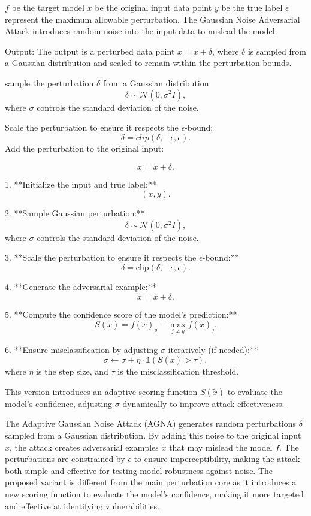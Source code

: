 \( f \) be the target model
\( x \) be the original input data point
\( y \) be the true label
\( \epsilon \) represent the maximum allowable perturbation. The Gaussian Noise Adversarial Attack introduces random noise into the input data to mislead the model.

Output: The output is a perturbed data point \( \tilde{x} = x + \delta \), where \( \delta \) is sampled from a Gaussian distribution and scaled to remain within the perturbation bounds.

sample the perturbation $\delta$ from a Gaussian distribution:
\[
\delta \sim \mathcal{N}(0, \sigma^2 I),
\]
where $\sigma$ controls the standard deviation of the noise.

Scale the perturbation to ensure it respects the $\epsilon$-bound:
\[
\delta = clip(\delta, -\epsilon, \epsilon).
\]
Add the perturbation to the original input:

\[
\tilde{x} = x + \delta.
\]


1. **Initialize the input and true label:**  
   \[
   (x, y).
   \]

2. **Sample Gaussian perturbation:**  
   \[
   \delta \sim \mathcal{N}(0, \sigma^2 I),
   \]
   where \( \sigma \) controls the standard deviation of the noise.

3. **Scale the perturbation to ensure it respects the \( \epsilon \)-bound:**  
   \[
   \delta = \text{clip}(\delta, -\epsilon, \epsilon).
   \]

4. **Generate the adversarial example:**  
   \[
   \tilde{x} = x + \delta.
   \]

5. **Compute the confidence score of the model's prediction:**  
   \[
   S(\tilde{x}) = f(\tilde{x})_{y} - \max\limits_{j \neq y} f(\tilde{x})_j.
   \]

6. **Ensure misclassification by adjusting \( \sigma \) iteratively (if needed):**  
   \[
   \sigma \leftarrow \sigma + \eta \cdot \mathbb{1} \left( S(\tilde{x}) > \tau \right),
   \]
   where \( \eta \) is the step size, and \( \tau \) is the misclassification threshold.

This version introduces an adaptive scoring function \( S(\tilde{x}) \) to evaluate the model's confidence, adjusting \( \sigma \) dynamically to improve attack effectiveness.



The Adaptive Gaussian Noise Attack (AGNA) generates random perturbations $ \delta $ sampled from a Gaussian distribution. By adding this noise to the original input $ x $, the attack creates adversarial examples $ \tilde{x} $ that may mislead the model $ f $. The perturbations are constrained by $\epsilon$ to ensure imperceptibility, making the attack both simple and effective for testing model robustness against noise.
The proposed variant is different from the main perturbation core as it introduces a new scoring function to evaluate the model's confidence, making it more targeted and effective at identifying vulnerabilities.